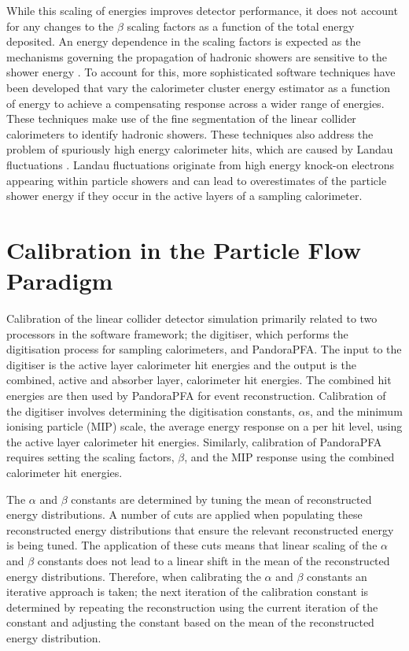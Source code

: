 While this scaling of energies improves detector performance, it does not account for any changes to the $\beta$ scaling factors as a function of the total energy deposited.  An energy dependence in the scaling factors is expected as the mechanisms governing the propagation of hadronic showers are sensitive to the shower energy \cite{Wigmans:2000vf}.  To account for this, more sophisticated software techniques have been developed that vary the calorimeter cluster energy estimator as a function of energy to achieve a compensating response across a wider range of energies.  These techniques make use of the fine segmentation of the linear collider calorimeters to identify hadronic showers.  These techniques also address the problem of spuriously high energy calorimeter hits, which are caused by Landau fluctuations \cite{Landau:1944if}.  Landau fluctuations originate from high energy knock-on electrons appearing within particle showers \cite{Bichsel:2004ej} and can lead to overestimates of the particle shower energy if they occur in the active layers of a sampling calorimeter.  


\section{Calibration in the Particle Flow Paradigm}
\label{sec:overviewcalibration}
Calibration of the linear collider detector simulation primarily related to two processors in the software framework; the digitiser, which performs the digitisation process for sampling calorimeters, and PandoraPFA.  The input to the digitiser is the active layer calorimeter hit energies and the output is the combined, active and absorber layer, calorimeter hit energies.  The combined hit energies are then used by PandoraPFA for event reconstruction.  Calibration of the digitiser involves determining the digitisation constants, $\alpha$s, and the minimum ionising particle (MIP) scale, the average energy response on a per hit level, using the active layer calorimeter hit energies.  Similarly, calibration of PandoraPFA requires setting the scaling factors, $\beta$, and the MIP response using the combined calorimeter hit energies.

The $\alpha$ and $\beta$ constants are determined by tuning the mean of reconstructed energy distributions.  A number of cuts are applied when populating these reconstructed energy distributions that ensure the relevant reconstructed energy is being tuned.  The application of these cuts means that linear scaling of the $\alpha$ and $\beta$ constants does not lead to a linear shift in the mean of the reconstructed energy distributions.  Therefore, when calibrating the $\alpha$ and $\beta$ constants an iterative approach is taken; the next iteration of the calibration constant is determined by repeating the reconstruction using the current iteration of the constant and adjusting the constant based on the mean of the reconstructed energy distribution.  

